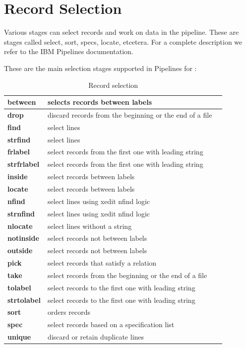 \section{Record Selection}
Various stages can select records and work on data in the
pipeline. These are stages called select, sort, specs, locate,
etcetera. For a complete description we refer to the IBM Pipelines
documentation. 

These are the main selection stages supported in Pipelines for \nr{}:

\begin{longtable}[l]{|l|p{10cm}|l|}
\caption{ Record selection } \\
\hline
\textbf{between}&selects records between labels \\
\hline
\textbf{drop}&discard records from the beginning or the end of a file \\
\hline
\textbf{find}&select lines \\
\hline
\textbf{strfind}&select lines \\
\hline
\textbf{frlabel}&select records from the first one with leading string \\
\hline
\textbf{strfrlabel}&select records from the first one with leading string \\
\hline
\textbf{inside}&select records between labels \\
\hline
\textbf{locate}&select records between labels \\
\hline
\textbf{nfind}&select lines using xedit nfind logic \\
\hline
\textbf{strnfind}&select lines using xedit nfind logic \\
\hline
\textbf{nlocate}&select lines without a string \\
\hline
\textbf{notinside}&select records not between labels \\
\hline
\textbf{outside}&select records not between labels \\
\hline
\textbf{pick}&select records that satisfy a relation \\
\hline
\textbf{take}&select records from the beginning or the end of a file \\
\hline
\textbf{tolabel}&select records to the first one with leading string \\
\hline
\textbf{strtolabel}&select records to the first one with leading string \\
\hline
\textbf{sort}&orders records \\
\hline
\textbf{spec}&select records based on a specification list \\
\hline
\textbf{unique}&discard or retain duplicate lines \\
\hline
\end{longtable}


